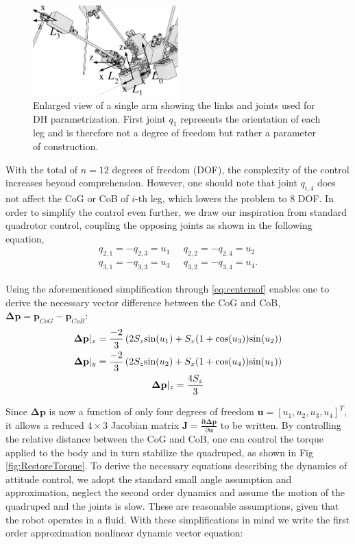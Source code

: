 \begin{figure}
	\centering
	\includegraphics[width=0.5\textwidth]{./img/DHParameters.pdf}
	\caption{Enlarged view of a single arm showing the links and joints used for DH parametrization. First joint $q_1$ represents the orientation of each leg and is therefore not a degree of freedom but rather a parameter of construction.}
	\label{fig:DHParameters}
\end{figure}

With the total of $n=12$ degrees of freedom (DOF), the complexity of the control increases beyond comprehension. However, one should note that joint $q_{i,4}$ does not affect the CoG or CoB of $i$-th leg, which lowers the problem to 8 DOF. In order to simplify the control even further, we draw our inspiration from standard quadrotor control, coupling the opposing joints as shown in the following equation,
\begin{gather}
q_{2,1}=-q_{2,3} = u_1 \;\;\;\;\;
q_{2,2}=-q_{2,4} = u_2  \\ \nonumber
q_{3,1}=-q_{3,3} = u_3 \;\;\;\;\;
q_{3,2}=-q_{3,4} = u_4. 
\end{gather}

Using the aforementioned simplification through \eqref{eq:centersof} enables one to derive the necessary vector difference between the CoG and CoB, $\boldsymbol{\Delta}\textbf{p} = \textbf{p}_{CoG}-\textbf{p}_{CoB}$:
\begin{gather}
\boldsymbol{\Delta}\textbf{p}|_x = \frac{-2}{3}\left( 2 S_z \textup{sin}(u_1)+S_x (1+\textup{cos}(u_3))\textup{sin}(u_2) \right )\\ \nonumber
\boldsymbol{\Delta}\textbf{p}|_y = \frac{-2}{3}\left( 2 S_z \textup{sin}(u_2)+S_x (1+\textup{cos}(u_4))\textup{sin}(u_1) \right )\\ \nonumber
\boldsymbol{\Delta}\textbf{p}|_z = \frac{4 S_z}{3} 
\end{gather}

Since $\boldsymbol{\Delta}\textbf{p}$ is now a function of only four degrees of freedom $\textbf{u}=[u_1,u_2,u_3, u_4]^T$, it allows a reduced $4 \times 3$ Jacobian matrix $\textbf{J}=\frac{\boldsymbol{\partial \Delta}\textbf{p}}{\partial \textbf{u}}$ to be written. By controlling the relative distance between the CoG and CoB, one can control the torque applied to the body and in turn stabilize the quadruped, as shown in Fig \ref{fig:RestoreTorque}. To derive the necessary equations describing the dynamics of attitude control, we adopt the standard small angle assumption and approximation, neglect the second order dynamics and assume the motion of the quadruped and the joints is slow. These are reasonable assumptions, given that the robot operates in a fluid. With these simplifications in mind we write the first order approximation nonlinear dynamic vector equation:

